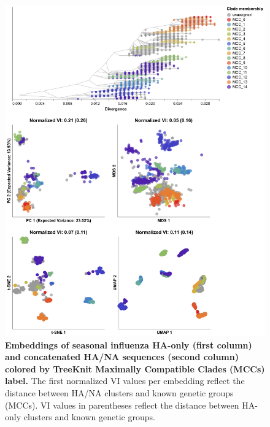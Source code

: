 \documentclass[10pt,letterpaper]{article}
\begin{document}
\begin{figure}[!h]
\includegraphics[width=\columnwidth]{figures/flu-2016-2018-ha-na-embeddings-by-mcc.png}
\caption{{\bf Embeddings of seasonal influenza HA-only (first column) and concatenated HA/NA sequences (second column) colored by TreeKnit Maximally Compatible Clades (MCCs) label.}
  The first normalized VI values per embedding reflect the distance between HA/NA clusters and known genetic groups (MCCs).
  VI values in parentheses reflect the distance between HA-only clusters and known genetic groups.
}
\label{fig:seasonal-influenza-h3n2-ha-na-2016-2018-embeddings}
\end{figure}
\end{document}
